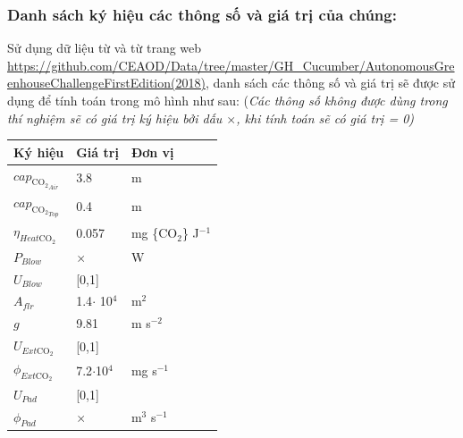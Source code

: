 \documentclass[a4paper]{article}
\begin{document}
\subsubsection{Danh sách ký hiệu các thông số và giá trị của chúng:}\label{parameter}
Sử dụng dữ liệu từ \cite{vanthoor2011model} và từ trang web \url{https://github.com/CEAOD/Data/tree/master/GH_Cucumber/AutonomousGreenhouseChallengeFirstEdition(2018)}, danh sách các thông số và giá trị sẽ được sử dụng để tính toán trong mô hình như sau:
(\emph{Các thông số không được dùng trong thí nghiệm sẽ có giá trị ký hiệu bởi dấu $\times$, khi tính toán sẽ có giá trị = 0)}
\begin{longtable}{l p{} l }
\toprule[\heavyrulewidth]
Ký hiệu                     & Giá trị               & Đơn vị                            \\ \midrule
$cap_{\mathrm{CO_2}_{Air}}$ & 3.8                   & m                                 \\
$cap_{\mathrm{CO_2}_{Top}}$ & 0.4                   & m                                 \\
$\eta_{Heat \mathrm{CO_2}}$ & 0.057                 & mg \{$\mathrm{CO_2}$\} J$^{-1}$       \\
$P_{Blow}$                  & $\times$              & W                                 \\
$U_{Blow}$                  & [0,1]                 &                                   \\
$A_{flr}$                   & 1.4$\cdot$ 10$^4$     & m$^2$      \\
$g$                         & 9.81                  & m s$^{-2}$                        \\
$U_{Ext\mathrm{CO_2}}$      & [0,1]                 &                                   \\
$\phi_{Ext\mathrm{CO_2}}$   & 7.2$\cdot$10$^4$      & mg s$^{-1}$                       \\
$U_{Pad}$                   & [0,1]                 &                                   \\
$\phi_{Pad}$                & $\times$              & m$^3$ s$^{-1}$                    \\

\end{longtable}
\end{document}
